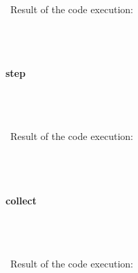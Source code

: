 \documentclass{article}
\begin{document}
\paragraph{}\
Result of the code execution:

\begin{verbatim} 

\end{verbatim}

\paragraph{}\





\paragraph{ step}\

\begin{verbatim}

\end{verbatim}


\paragraph{}\
Result of the code execution:

\begin{verbatim} 

\end{verbatim}

\paragraph{}\





\paragraph{ collect}\

\begin{verbatim}

\end{verbatim}


\paragraph{}\
Result of the code execution:
\end{document}

